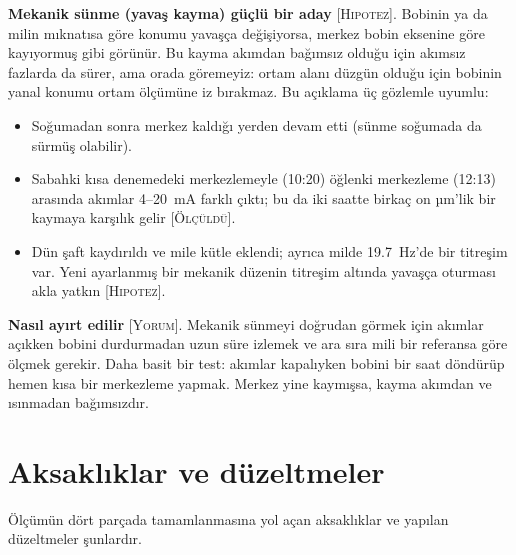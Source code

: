 \documentclass[11pt,a4paper]{article}
\newcommand{\olc}{\textsc{[Ölçüldü]}}
\newcommand{\yor}{\textsc{[Yorum]}}
\newcommand{\hip}{\textsc{[Hipotez]}}
\begin{document}
\textbf{Mekanik sünme (yavaş kayma) güçlü bir aday} \hip. Bobinin ya da milin mıknatısa göre konumu yavaşça
değişiyorsa, merkez bobin eksenine göre kayıyormuş gibi görünür. Bu kayma akımdan bağımsız olduğu için
akımsız fazlarda da sürer, ama orada göremeyiz: ortam alanı düzgün olduğu için bobinin yanal konumu
ortam ölçümüne iz bırakmaz. Bu açıklama üç gözlemle uyumlu:
\begin{itemize}
\item Soğumadan sonra merkez kaldığı yerden devam etti (sünme soğumada da sürmüş olabilir).
\item Sabahki kısa denemedeki merkezlemeyle (10:20) öğlenki merkezleme (12:13) arasında akımlar 4--20~mA
farklı çıktı; bu da iki saatte birkaç on µm'lik bir kaymaya karşılık gelir \olc.
\item Dün şaft kaydırıldı ve mile kütle eklendi; ayrıca milde 19.7~Hz'de bir titreşim var. Yeni ayarlanmış
bir mekanik düzenin titreşim altında yavaşça oturması akla yatkın \hip.
\end{itemize}

\textbf{Nasıl ayırt edilir} \yor. Mekanik sünmeyi doğrudan görmek için akımlar açıkken bobini durdurmadan
uzun süre izlemek ve ara sıra mili bir referansa göre ölçmek gerekir. Daha basit bir test: akımlar kapalıyken
bobini bir saat döndürüp hemen kısa bir merkezleme yapmak. Merkez yine kaymışsa, kayma akımdan ve ısınmadan
bağımsızdır.

\section{Aksaklıklar ve düzeltmeler}

Ölçümün dört parçada tamamlanmasına yol açan aksaklıklar ve yapılan düzeltmeler şunlardır.
\end{document}
